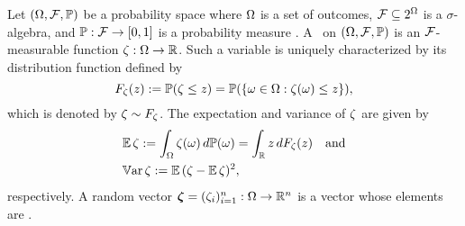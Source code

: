 Let $(\Omega, \mathcal{F}, \mathbb{P})$ be a probability space where $\Omega$ is a set of
outcomes, $\mathcal{F} \subseteq 2^\Omega$ is a $\sigma$-algebra, and
$\mathbb{P}: \mathcal{F} \to [0, 1]$ is a probability measure
\cite{durrett2010}. A \rv\ on $(\Omega, \mathcal{F}, \mathbb{P})$ is an
$\mathcal{F}$-measurable function $\zeta: \Omega \to \mathbb{R}$. Such a variable
is uniquely characterized by its distribution function defined by
\begin{equation*}
  F_\zeta(z) := \mathbb{P}(\zeta \leq z) = \mathbb{P}(\{ \omega \in \Omega: \zeta(\omega) \leq z \}),
\end{equation*}
which is denoted by $\zeta \sim F_\zeta$. The expectation and variance of
$\zeta$ are given by
\begin{align*}
  & \mathbb{E} \, \zeta := \int_\Omega \zeta(\omega) \, d\mathbb{P}(\omega) = \int_{\mathbb{R}} z \, d F_\zeta(z) \hspace{1em} \text{and} \\
  & \mathbb{V}\text{ar} \, \zeta := \mathbb{E} \, (\zeta - \mathbb{E} \, \zeta)^2,
\end{align*}
respectively. A random vector $\bm{\zeta} = (\zeta_i)_{i = 1}^n: \Omega \to \mathbb{R}^n$ is
a vector whose elements are \rvs.

